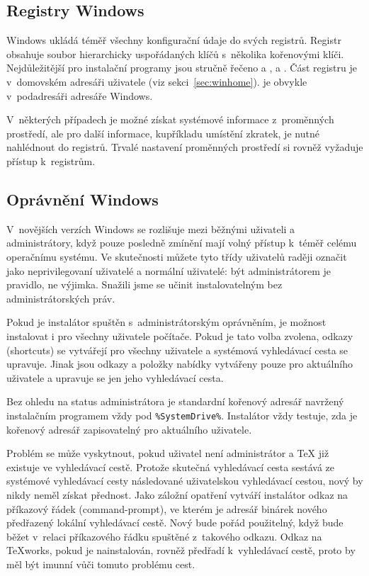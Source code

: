 \documentclass[\classoptions,slovak,english,czech]{\classname}
\begin{document}
\subsection{Registry Windows}
\label{sec:registry}
Windows ukládá téměř všechny konfigurační údaje do svých registrů. Registr 
obsahuje soubor hierarchicky uspořádaných klíčů s~několika kořenovými klíči. 
Nejdůležitější pro instalační programy jsou stručně řečeno 
 a ,  a
. Část  registru je v~domovském adresáři 
uživatele (viz sekci~\ref{sec:winhome}).  je 
obvykle v~podadresáři adresáře Windows.

V~některých případech je možné získat systémové informace z~proměnných
prostředí, ale pro další informace, kupříkladu umístění zkratek, je nutné
nahlédnout do registrů. Trvalé nastavení proměnných prostředí si rovněž
vyžaduje přístup k~registrům.

\subsection{Oprávnění Windows}
\label{sec:winpermissions}

V~novějších verzích Windows se rozlišuje mezi běžnými uživateli a
administrátory, když pouze posledně zmínění mají volný přístup k~téměř celému
operačnímu systému. Ve skutečnosti můžete tyto třídy uživatelů raději
označit jako neprivilegovaní uživatelé a normální uživatelé: být
administrátorem je pravidlo, ne výjimka. Snažili jsme se učinit
\TL{} instalovatelným bez administrátorských práv. 

Pokud je instalátor spuštěn s~administrátorským oprávněním, je možnost instalovat 
i pro všechny uživatele počítače. Pokud je tato volba zvolena,
odkazy (shortcuts) se vytvářejí pro 
všechny uživatele a systémová vyhledávací cesta %
se upravuje. Jinak jsou odkazy a
položky nabídky vytvářeny pouze pro aktuálního uživatele a upravuje
se jen jeho vyhledávací cesta. %

Bez ohledu na status administrátora je standardní kořenový adresář \TL{}
navržený instalačním programem vždy pod \verb|%SystemDrive%|.
Instalátor vždy testuje, zda je kořenový adresář
zapisovatelný pro aktuálního uživatele.

Problém se může vyskytnout, pokud uživatel není administrátor a \TeX{} již
existuje ve vyhledávací cestě. Protože skutečná vyhledávací cesta sestává ze
systémové vyhledávací cesty následované uživatelskou vyhledávací cestou, 
nový \TL{} by nikdy neměl získat přednost.  
Jako záložní opatření vytváří instalátor odkaz na příkazový řádek
(command-prompt), ve kterém je adresář binárek nového \TL{} 
předřazený lokální vyhledávací cestě.  Nový \TL{} bude pořád použitelný, když
bude běžet v~relaci příkazového řádku spuštěné z~takového odkazu. Odkaz na 
\TeX{}works, pokud je nainstalován, rovněž předřadí \TL{} 
k~vyhledávací cestě, proto by měl být imunní vůči tomuto problému cest.
\end{document}
